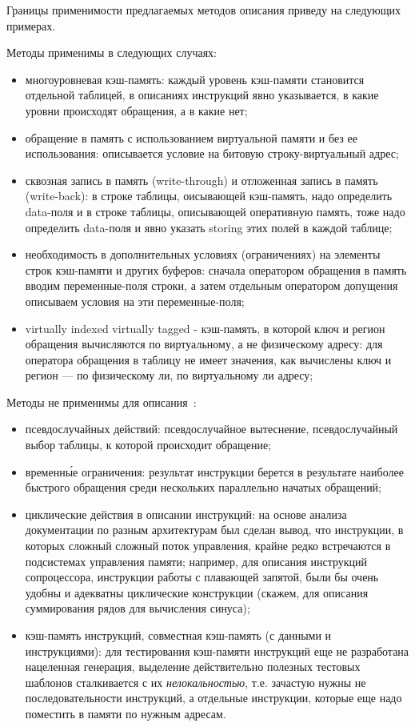 Границы применимости предлагаемых методов описания приведу на следующих
примерах.

Методы применимы в следующих случаях:
\begin{itemize}
    \item многоуровневая кэш-память: каждый уровень кэш-памяти становится
отдельной таблицей, в описаниях инструкций явно указывается, в какие уровни
происходят обращения, а в какие нет;
    \item обращение в память с использованием виртуальной памяти и без ее
использования: описывается условие на битовую строку-виртуальный адрес;
    \item сквозная запись в память (write-through) и отложенная запись в память
(write-back): в строке таблицы, оисывающей кэш-память, надо определить data-поля
и в строке таблицы, описывающей оперативную память, тоже надо определить
data-поля и явно указать storing этих полей в каждой таблице;
    \item необходимость в дополнительных условиях (ограничениях) на элементы
строк кэш-памяти и других буферов: сначала оператором обращения в память вводим
переменные-поля строки, а затем отдельным оператором допущения описываем условия
на эти переменные-поля;
    \item virtually indexed virtually tagged - кэш-память, в которой ключ и
регион обращения вычисляются по виртуальному, а не физическому адресу: для
оператора обращения в таблицу не имеет значения, как вычислены ключ и регион ---
по физическому ли, по виртуальному ли адресу;
\end{itemize}


Методы не применимы для описания~\cite{my_ewdts_2009}:
\begin{itemize}
    \item псевдослучайных действий: псевдослучайное вытеснение, псевдослучайный
выбор таблицы, к которой происходит обращение;
    \item временн\'{ы}е ограничения: результат инструкции берется в результате
наиболее быстрого обращения среди нескольких параллельно начатых обращений;
    \item циклические действия в описании инструкций: на основе анализа
документации по разным архитектурам был сделан вывод, что инструкции, в которых
сложный сложный поток управления, крайне редко встречаются в подсистемах
управления памяти; например, для описания инструкций сопроцессора, инструкции
работы с плавающей запятой, были бы очень удобны и адекватны циклические
конструкции (скажем, для описания суммирования рядов для вычисления синуса);
    \item кэш-память инструкций, совместная кэш-память (с данными и
инструкциями): для тестирования кэш-памяти инструкций еще не разработана
нацеленная генерация, выделение действительно полезных тестовых шаблонов
сталкивается с их \emph{нелокальностью}, т.е. зачастую нужны не
последовательности инструкций, а отдельные инструкции, которые еще надо
поместить в памяти по нужным адресам.
\end{itemize}

